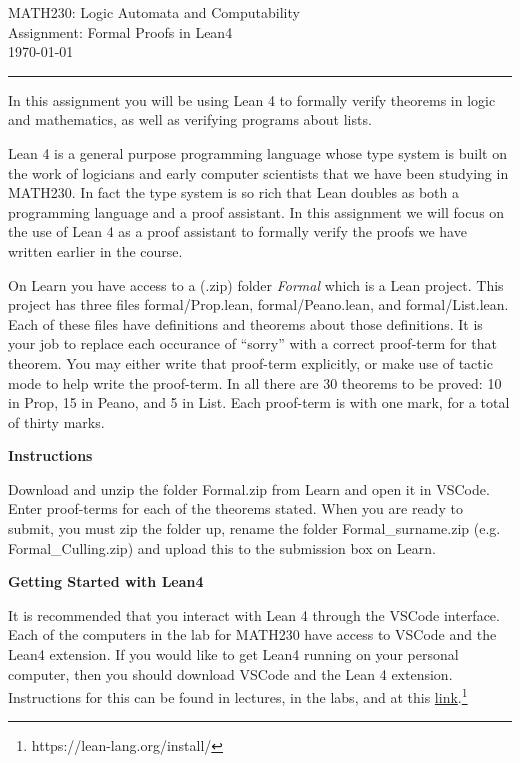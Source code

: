 \documentclass[12pt,letterpaper, onecolumn]{exam}
\begin{document}
\begingroup  
    \centering
    \LARGE MATH230: Logic Automata and Computability\\
    \LARGE Assignment: Formal Proofs in Lean4\\[0.5em]
    \large \today\\[0.5em]
\endgroup
\rule{\textwidth}{0.4pt}
\pointsdroppedatright   %
\printanswers
\renewcommand{\solutiontitle}{\noindent\textbf{Ans:}\enspace}   %



In this assignment you will be using Lean 4 to formally verify theorems in logic and mathematics, as well as verifying programs about lists. 

Lean 4 is a general purpose programming language whose type system is built on the work of logicians and early computer scientists that we have been studying in MATH230. In fact the type system is so rich that Lean doubles as both a programming language and a proof assistant. In this assignment we will focus on the use of Lean 4 as a proof assistant to formally verify the proofs we have written earlier in the course. 

On Learn you have access to a (.zip) folder \emph{Formal} which is a Lean project. This project has three files formal/Prop.lean, formal/Peano.lean, and formal/List.lean. Each of these files have definitions and theorems about those definitions. It is your job to replace each occurance of ``sorry'' with a correct proof-term for that theorem. You may either write that proof-term explicitly, or make use of tactic mode to help write the proof-term. In all there are 30 theorems to be proved: 10 in Prop, 15 in Peano, and 5 in List. Each proof-term is with one mark, for a total of thirty marks.

\vspace{2mm}
\textbf{Instructions}

Download and unzip the folder Formal.zip from Learn and open it in VSCode. Enter proof-terms for each of the theorems stated. When you are ready to submit, you must zip the folder up, rename the folder Formal\_surname.zip (e.g. Formal\_Culling.zip) and upload this to the submission box on Learn.

\vspace{2mm}
\textbf{Getting Started with Lean4}

It is recommended that you interact with Lean 4 through the VSCode interface. Each of the computers in the lab for MATH230 have access to VSCode and the Lean4 extension. If you would like to get Lean4 running on your personal computer, then you should download VSCode and the Lean 4 extension. Instructions for this can be found in lectures, in the labs, and at this \href{https://lean-lang.org/install/}{link}.\footnote{https://lean-lang.org/install/}
\end{document}
